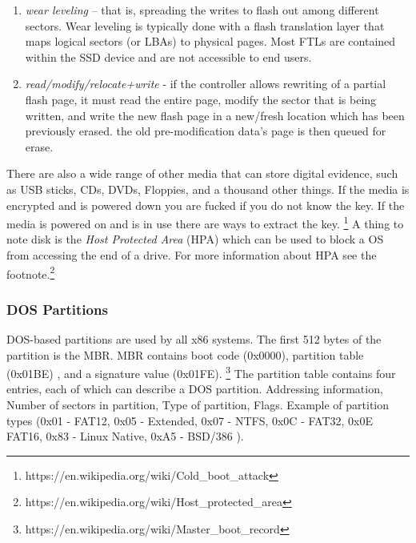 \begin{enumerate}
    \item \textit{wear leveling} – that is, spreading the writes to flash out 
        among different sectors. Wear leveling is typically done with a flash 
        translation layer that maps logical sectors (or LBAs) to physical pages.
        Most FTLs are contained within the SSD device and are not accessible to 
        end users.

    \item \textit{read/modify/relocate+write} - if the controller allows 
        rewriting of a partial flash page, it must read the entire page, modify 
        the sector that is being written, and write the new flash page in a 
        new/fresh location which has been previously erased. the old 
        pre-modification data's page is then queued for erase.
\end{enumerate}
There are also a wide range of other media that can store digital evidence, such
as USB sticks, CDs, DVDs, Floppies, and a thousand other things. If the media is
encrypted and is powered down you are fucked if you do not know the key. If the
media is powered on and is in use there are ways to extract the key.
\footnote{https://en.wikipedia.org/wiki/Cold\_boot\_attack} A thing to note 
disk is the \textit{Host Protected Area} (HPA) which can be used to block a OS
from accessing the end of a drive. For more information about HPA see the 
footnote.\footnote{https://en.wikipedia.org/wiki/Host\_protected\_area}

\subsubsection{DOS Partitions}
DOS-based partitions are used by all x86 systems. The first 512 bytes of the
partition is the MBR. MBR contains boot code (0x0000), partition table (0x01BE)
, and a signature value (0x01FE).
\footnote{https://en.wikipedia.org/wiki/Master\_boot\_record}
The partition table contains four entries, each of which can describe a DOS 
partition. Addressing information, Number of sectors in partition, Type of 
partition, Flags. Example of partition types (0x01 - FAT12, 0x05 - Extended, 
0x07 - NTFS, 0x0C - FAT32, 0x0E FAT16, 0x83 - Linux Native, 0xA5 - BSD/386 ).


